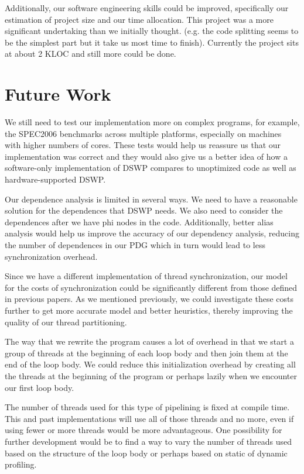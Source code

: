 \documentclass[11pt, letter]{article}
\begin{document}
Additionally, our software engineering skills could be improved, specifically our estimation of project size and our time allocation.  This project was a more significant undertaking than we initially thought. (e.g. the code splitting seems to be the simplest part but it take us most time to finish). Currently the project sits at about 2 KLOC and still more could be done.  

\section{Future Work}
We still need to test our implementation more on complex programs, for example, the SPEC2006 benchmarks across multiple platforms, especially on machines with higher numbers of cores.  These tests would help us reassure us that our implementation was correct and they would also give us a better idea of how a software-only implementation of DSWP compares to unoptimized code as well as hardware-supported DSWP.

Our dependence analysis is limited in several ways.  We need to have a reasonable solution for the dependences that DSWP needs.  We also need to consider the dependences after we have phi nodes in the code. Additionally, better alias analysis would help us improve the accuracy of our dependency analysis, reducing the number of dependences in our PDG which in turn would lead to less synchronization overhead.

Since we have a different implementation of thread synchronization, our model for the costs of synchronization could be significantly different from those defined in previous papers. As we mentioned previously, we could investigate these costs further to get more accurate model and better heuristics, thereby improving the quality of our thread partitioning.

The way that we rewrite the program causes a lot of overhead in that we start a group of threads at the beginning of each loop body and then join them at the end of the loop body.  We could reduce this initialization overhead by creating all the threads at the beginning of the program or perhaps lazily when we encounter our first loop body.

The number of threads used for this type of pipelining is fixed at compile time.  This and past  implementations will use all of those threads and no more, even if using fewer or more threads would be more advantageous.  One possibility for further development would be to find a way to vary the number of threads used based on the structure of the loop body or perhaps based on static of dynamic profiling.
\end{document}
